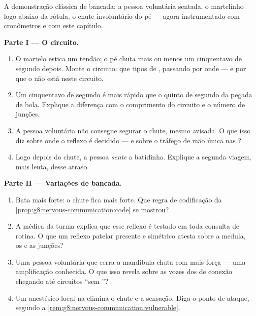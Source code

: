 \begin{problem}\label{pb:g8:nervous-communication:1}
A demonstração clássica de bancada: a pessoa voluntária sentada, o
martelinho logo abaixo da rótula, o chute involuntário do pé --- agora
instrumentado com cronômetros e com este capítulo.

\medskip\noindent\textbf{Parte I --- O circuito.}
\begin{enumerate}
  \item O martelo estica um tendão; o pé chuta mais ou menos um
        cinquentavo de segundo depois. Monte o circuito: que tipos de
        , passando por onde --- e por que o  não está
        neste circuito.
  \item Um cinquentavo de segundo é mais rápido que o quinto de
        segundo da pegada de bola. Explique a diferença com o
        comprimento do circuito e o número de junções.
  \item A pessoa voluntária não consegue segurar o chute, mesmo
        avisada. O que isso diz sobre onde o reflexo é decidido --- e
        sobre o tráfego de mão única nas ?
  \item Logo depois do chute, a pessoa \emph{sente} a batidinha.
        Explique a segunda viagem, mais lenta, desse atraso.
\end{enumerate}

\medskip\noindent\textbf{Parte II --- Variações de bancada.}
\begin{enumerate}[resume]
  \item Bata mais forte: o chute fica mais forte. Que regra de
        codificação da \cref{prop:g8:nervous-communication:code} se
        mostrou?
  \item A médica da turma explica que esse reflexo é testado em toda
        consulta de rotina. O que um reflexo patelar presente e
        simétrico atesta sobre a medula, os  e as junções?
  \item Uma pessoa voluntária que cerra a mandíbula chuta com mais
        força --- uma amplificação conhecida. O que isso revela sobre
        as vozes dos  de conexão chegando até circuitos
        ``sem ''?
  \item Um anestésico local na  elimina o chute e a sensação.
        Diga o ponto de ataque, segundo a
        \cref{rem:g8:nervous-communication:vulnerable}.
\end{enumerate}


\end{problem}
